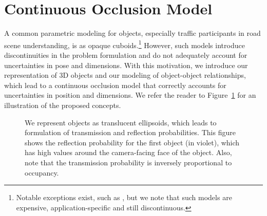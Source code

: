 \section{Continuous Occlusion Model}
\label{sec:setup}



\def\TP{TP}
A common parametric modeling for objects, especially traffic participants in road scene understanding, is as opaque cuboids.\footnote{Notable exceptions exist, such as \cite{Zia_etal_2014,Zia2015}, but we note that such models are expensive, application-specific and still discontinuous.} However, such models introduce discontinuities in the problem formulation and do not adequately account for uncertainties in pose and dimensions. With this motivation, we introduce our representation of 3D objects and our modeling of object-object relationships, which lead to a continuous occlusion model that correctly accounts for uncertainties in position and dimensions. We refer the reader to Figure~\ref{fig:reflectiontransimission} for an illustration of the proposed concepts.


\begin{figure}
  \usetikzlibrary{calc}
  \centering
  \begin{tikzpicture}
    
  \end{tikzpicture}
  \vspace{-0.3cm}
  \caption{\small We represent objects as translucent ellipsoids, which leads to formulation of transmission and reflection probabilities. This figure shows the reflection probability for the first object (in violet), which has high values around the camera-facing face of the object. Also, note that the transmission probability is inversely proportional to occupancy.}
  \label{fig:reflectiontransimission}
  \vspace{-0.3cm}
\end{figure}


